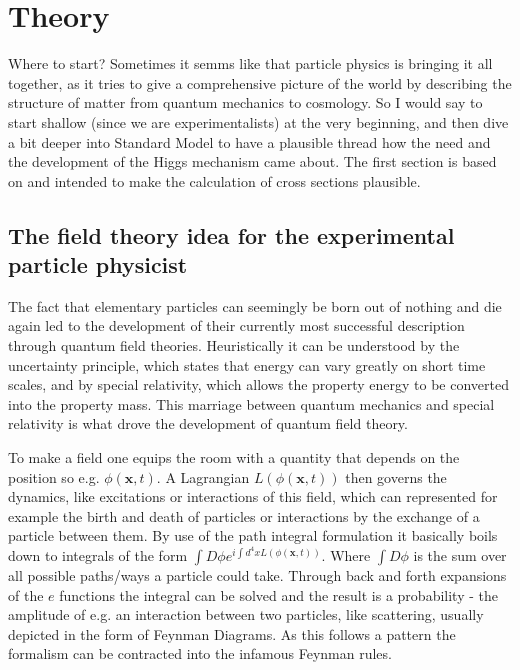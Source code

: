 \chapter{Theory}

Where to start? Sometimes it semms like that particle physics is bringing it all together, as it tries to give a comprehensive picture of the world by describing the structure of matter from quantum mechanics to cosmology. So I would say to start shallow (since we are experimentalists) at the very beginning, and then dive a bit deeper into Standard Model to have a plausible thread how the need and the development of the Higgs mechanism came about. The first section is based on \citet{zee2010quantum} and intended to make the calculation of cross sections plausible.

\section{The field theory idea for the experimental particle physicist}
The fact that elementary particles can seemingly be born out of nothing and die again led to the development of their currently most successful description through quantum field theories. Heuristically it can be understood by the uncertainty principle, which states that energy can vary greatly on short time scales, and by special relativity, which allows the property energy to be converted into the property mass. This marriage between quantum mechanics and special relativity is what drove the development of quantum field theory. 

To make a field one equips the room with a quantity that depends on the position so e.g. $\phi(\bm{x},t)$. A Lagrangian $L(\phi(\bm{x},t))$ then governs the dynamics, like excitations or interactions of this field, which can represented for example the birth and death of particles or interactions by the exchange of a particle between them. By use of the path integral formulation it basically boils down to integrals of the form $\int D\phi e^{i\int d^4x L(\phi(\bm{x},t))}$. Where $\int D\phi$ is the sum over all possible paths/ways a particle could take. Through back and forth expansions of the $e$ functions the integral can be solved and the result is a probability - the amplitude of e.g. an interaction between two particles, like scattering, usually depicted in the form of Feynman Diagrams. As this follows a pattern the formalism can be contracted into the infamous Feynman rules. 

